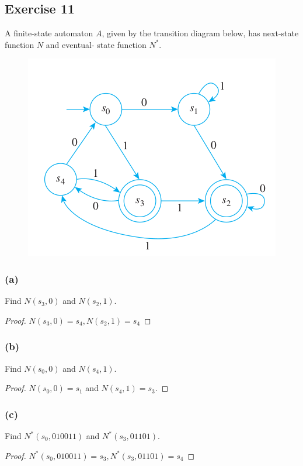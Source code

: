 \documentclass[14pt]{extarticle}
\begin{document}
\subsection{Exercise 11}
A finite-state automaton \(A\), given by the transition diagram below, has next-state function \(N\) and eventual-
state function \(N^*\).

\begin{figure}[ht!]
\centering
\includegraphics[scale=0.5]{../images/12.2.11.png}
\end{figure}

\subsubsection{(a)}
Find \(N(s_3, 0)\) and \(N(s_2, 1)\).
\begin{proof}
\(N(s_3, 0) = s_4, N(s_2, 1) = s_4\)
\end{proof}

\subsubsection{(b)}
Find \(N(s_0, 0)\) and \(N(s_4, 1)\).
\begin{proof}
\(N(s_0, 0) = s_1\) and \(N(s_4, 1) = s_3\).
\end{proof}

\subsubsection{(c)}
Find \(N^*(s_0, 010011)\) and \(N^*(s_3, 01101)\).
\begin{proof}
\(N^*(s_0, 010011) = s_3, N^*(s_3, 01101) = s_4\)
\end{proof}
\end{document}
